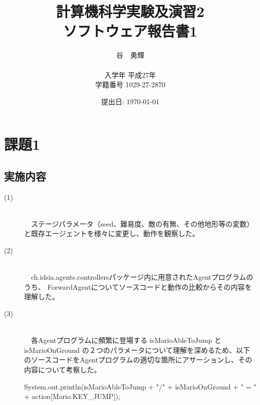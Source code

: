 \documentclass[a4j]{jarticle}
\begin{document}
\title{計算機科学実験及演習2 \\ \bf ソフトウェア報告書1}
\author{谷　勇輝 \\ \\入学年 平成27年 \\ 学籍番号 1029-27-2870}
\date{提出日: \today} %
\maketitle

\section{課題1}
\subsection{実施内容}
\begin{description}
\item[(1)]~\\
　ステージパラメータ（seed、難易度、敵の有無、その他地形等の変数）と既存エージェントを様々に変更し、動作を観察した。
\item[(2)]~\\
　ch.idsia.agents.controllersパッケージ内に用意されたAgentプログラムのうち、
ForwardAgentについてソースコードと動作の比較からその内容を理解した。
\item[(3)]~\\
　各Agentプログラムに頻繁に登場する isMarioAbleToJump と isMarioOnGround の２つのパラメータについて理解を深めるため、以下のソースコードをAgentプログラムの適切な箇所にアサーションし、その内容について考察した。
\begin{screen}
System.out.println(isMarioAbleToJump + "/" + isMarioOnGround + " = " + action[Mario.KEY\_JUMP]);
\end{screen}
\end{description}
\end{document}
